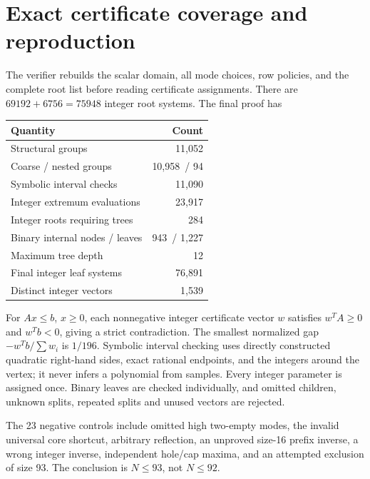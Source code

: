 \documentclass[11pt,a4paper]{article}
\newcommand{\RootGroups}{11,052}
\newcommand{\CoarseGroups}{10,958}
\newcommand{\NestedGroups}{94}
\newcommand{\IntervalChecks}{11,090}
\newcommand{\ExtremumPoints}{23,917}
\newcommand{\TreeRoots}{284}
\newcommand{\BinaryNodes}{943}
\newcommand{\TreeLeaves}{1,227}
\newcommand{\MaxDepth}{12}
\newcommand{\FinalSystems}{76,891}
\newcommand{\Vectors}{1,539}
\newcommand{\MinGap}{1/196}
\begin{document}
\section{Exact certificate coverage and reproduction}
The verifier rebuilds the scalar domain, all mode choices, row policies,
and the complete root list before reading certificate assignments.
There are $69192+6756=75948$ integer root systems. The final proof has
\begin{center}\small
\begin{tabular}{lr}\toprule
Quantity&Count\\\midrule
Structural groups&\RootGroups\\
Coarse / nested groups&\CoarseGroups\ / \NestedGroups\\
Symbolic interval checks&\IntervalChecks\\
Integer extremum evaluations&\ExtremumPoints\\
Integer roots requiring trees&\TreeRoots\\
Binary internal nodes / leaves&\BinaryNodes\ / \TreeLeaves\\
Maximum tree depth&\MaxDepth\\
Final integer leaf systems&\FinalSystems\\
Distinct integer vectors&\Vectors\\\bottomrule
\end{tabular}
\end{center}
For $Ax\le b$, $x\ge0$, each nonnegative integer certificate vector $w$
satisfies $w^TA\ge0$ and $w^Tb<0$, giving a strict contradiction.
The smallest normalized gap $-w^Tb/\sum w_i$ is $\MinGap$.
Symbolic interval checking uses directly constructed quadratic right-hand
sides, exact rational endpoints, and the integers around the vertex;
it never infers a polynomial from samples. Every integer parameter is
assigned once. Binary leaves are checked individually, and omitted
children, unknown splits, repeated splits and unused vectors are rejected.

The 23 negative controls include omitted high two-empty modes, the
invalid universal core shortcut, arbitrary reflection, an unproved
size-16 prefix inverse, a wrong integer inverse, independent hole/cap maxima, and an attempted
exclusion of size 93. The conclusion is $N\le93$, not $N\le92$.
\clearpage
\end{document}

